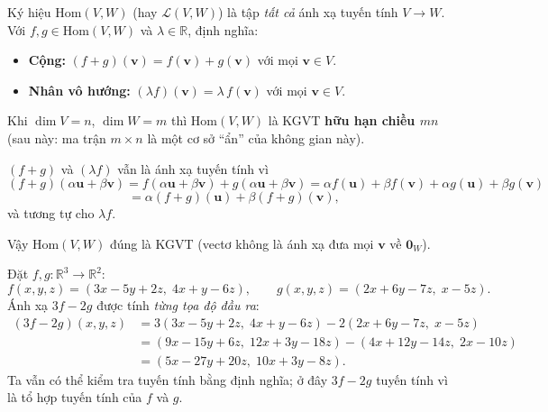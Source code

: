 \documentclass[12pt,a4paper]{article}
\begin{document}
\begin{dinhnghia}[title={Không gian $\mathrm{Hom}(V,W)$} (homomorphism: đồng cấu)]
  Ký hiệu $\mathrm{Hom}(V,W)$ (hay $\mathcal{L}(V,W)$) là tập \emph{tất cả} ánh xạ tuyến tính $V \to W$. Với $f, g \in \mathrm{Hom}(V,W)$ và $\lambda \in \mathbb{R}$, định nghĩa:
  \begin{itemize}
    \item \textbf{Cộng:} $(f + g)(\mathbf{v}) = f(\mathbf{v}) + g(\mathbf{v})$ với mọi $\mathbf{v} \in V$.
    \item \textbf{Nhân vô hướng:} $(\lambda f)(\mathbf{v}) = \lambda\, f(\mathbf{v})$ với mọi $\mathbf{v} \in V$.
  \end{itemize}
  Khi $\dim V = n$, $\dim W = m$ thì $\mathrm{Hom}(V,W)$ là KGVT \textbf{hữu hạn chiều $mn$} (sau này: ma trận $m \times n$ là một cơ sở ``ẩn'' của không gian này).
\end{dinhnghia}

\begin{tinhchat}
$(f+g)$ và $(\lambda f)$ vẫn là ánh xạ tuyến tính vì
\[
  (f+g)(\alpha\mathbf{u}+\beta\mathbf{v})
  = f(\alpha\mathbf{u}+\beta\mathbf{v}) + g(\alpha\mathbf{u}+\beta\mathbf{v})
  = \alpha f(\mathbf{u})+\beta f(\mathbf{v}) + \alpha g(\mathbf{u})+\beta g(\mathbf{v})
\]
\[
  = \alpha(f+g)(\mathbf{u})+\beta(f+g)(\mathbf{v}),
\]
và tương tự cho $\lambda f$.

Vậy $\mathrm{Hom}(V,W)$ đúng là KGVT (vectơ không là ánh xạ đưa mọi $\mathbf{v}$ về $\mathbf{0}_W$).
\end{tinhchat}

\begin{vidu}[title={Cộng và nhân vô hướng trên $\mathrm{Hom}(\mathbb{R}^3, \mathbb{R}^2)$}]
Đặt $f, g: \mathbb{R}^3 \to \mathbb{R}^2$:
\[
  f(x, y, z) = (3x - 5y + 2z,\; 4x + y - 6z),\qquad
  g(x, y, z) = (2x + 6y - 7z,\; x - 5z).
\]
Ánh xạ $3f - 2g$ được tính \emph{từng tọa độ đầu ra}:
\begin{align*}
  (3f - 2g)(x, y, z)
  &= 3(3x - 5y + 2z,\; 4x + y - 6z) - 2(2x + 6y - 7z,\; x - 5z)\\
  &= (9x - 15y + 6z,\; 12x + 3y - 18z) - (4x + 12y - 14z,\; 2x - 10z)\\
  &= \boxed{(5x - 27y + 20z,\; 10x + 3y - 8z)}.
\end{align*}
Ta vẫn có thể kiểm tra tuyến tính bằng định nghĩa; ở đây $3f - 2g$ tuyến tính vì là tổ hợp tuyến tính của $f$ và $g$.
\end{vidu}
\end{document}

